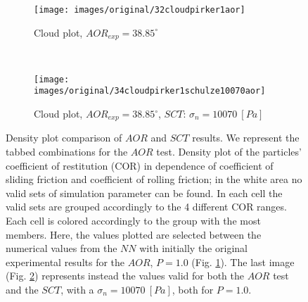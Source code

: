 \begin{figure}[htp] \centering
    \begin{subfigure}[b]{0.96\columnwidth}
        \texttt{[image: images/original/32cloudpirker1aor]}
        \caption{Cloud plot, $AOR_{exp} = 38.85 ^\circ$}
        \label{fig:32cloudpirker1aor} 
    \end{subfigure}\\
    \begin{subfigure}[b]{0.96\columnwidth}
        \texttt{[image: images/original/34cloudpirker1schulze10070aor]}
        \caption{Cloud plot, $AOR_{exp} = 38.85
        ^\circ$, $SCT$: $\sigma_n=10070 ~[Pa]$}
        \label{fig:34cloudpirker1schulze10070aor} 
    \end{subfigure}
    \caption[Density plot comparison of AOR and SCT results]{Density plot
    comparison of $AOR$ and $SCT$ results. We represent the tabbed combinations for the
    $AOR$ test.
    Density plot of the particles' coefficient of restitution (COR) in dependence
	of coefficient of sliding friction and coefficient of rolling friction; in the
	white area no valid sets of simulation parameter can be found.
	In each cell the valid sets are grouped accordingly to the 4 different COR
	ranges.
	Each cell is colored accordingly to the group with the most members. 
    Here, the values plotted are selected between the numerical
    values from the $NN$ with initially the original experimental results for
    the $AOR$, $P=1.0$ (Fig.
    \ref{fig:32cloudpirker1aor}). 
    The last image (Fig. \ref{fig:34cloudpirker1schulze10070aor}) represents
    instead the values valid for both the $AOR$ test and the $SCT$, with a
    $\sigma_n=10070 ~[Pa]$, both for $P=1.0$. }
    \label{fig:35schulze10070aorradarandcloud}
\end{figure}